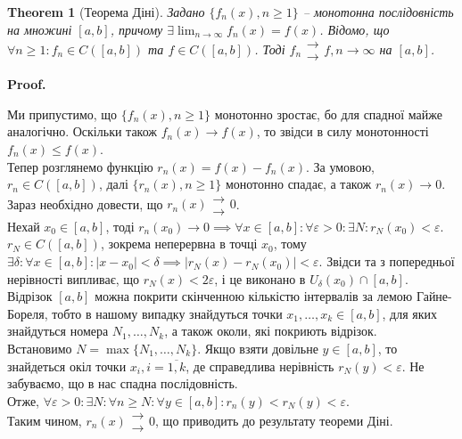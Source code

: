 \documentclass[a4paper, 10pt]{article}
\makeatletter
\def\huge{\displaystyle}
\def\qed{$\blacksquare$}
\theoremstyle{theoremdd}
\newtheorem{theorem}{Theorem}[subsection]
\theoremstyle{theoremdd}
\theoremstyle{theoremdd}
\theoremstyle{theoremdd}
\theoremstyle{theoremdd}
\newtheorem{example}[theorem]{Example}
\theoremstyle{theoremdd}
\theoremstyle{theoremdd}
\theoremstyle{theoremdd}
\theoremstyle{theoremdd}
\renewenvironment{proof}[1][Proof.\\]{\par
\pushQED{\hfill \qed}%
\normalfont \topsep6\p@\@plus6\p@\relax
\trivlist
\item\relax
{\bfseries
#1\@addpunct{.}}\hspace\labelsep\ignorespaces
}{%
\popQED\endtrivlist\@endpefalse
}
\makeatother
\begin{document}
\begin{theorem}[Теорема Діні]
Задано $\{ f_n(x), n \geq 1 \}$ -- монотонна послідовність на множині $[a,b]$, причому $\exists \huge\lim_{n \to \infty} f_n(x) = f(x)$. Відомо, що $\forall n \geq 1: f_n \in C([a,b])$ та $f \in C([a,b])$. Тоді $f_n \substack{\rightarrow \\ \rightarrow} f, n \to \infty$ на $[a,b]$.
\end{theorem}

\begin{proof}
Ми припустимо, що $\{ f_n(x), n \geq 1 \}$ монотонно зростає, бо для спадної майже аналогічно. Оскільки також $f_n(x) \to f(x)$, то звідси в силу монотонності $f_n(x) \leq f(x)$.\\
Тепер розглянемо функцію $r_n(x) = f(x) - f_n(x)$. За умовою, $r_n \in C([a,b])$, далі $\{r_n(x), n \geq 1\}$ монотонно спадає, а також $r_n(x) \to 0$. Зараз необхідно довести, що $r_n(x) \substack{\rightarrow \\ \rightarrow} 0$.\\
Нехай $x_0 \in [a,b]$, тоді $r_n(x_0) \to 0 \implies \forall x \in [a,b]: \forall \varepsilon > 0: \exists N: r_N(x_0) < \varepsilon$.
$r_N \in C([a,b])$, зокрема неперервна в точці $x_0$, тому $\exists \delta: \forall x \in [a,b]: |x-x_0| < \delta \implies |r_N(x) - r_N(x_0)| < \varepsilon$. Звідси та з попередньої нерівності випливає, що $r_N(x) < 2\varepsilon$, і це виконано в $U_{\delta} (x_0) \cap [a,b]$.\\
Відрізок $[a,b]$ можна покрити скінченною кількістю інтервалів за лемою Гайне-Бореля, тобто в нашому випадку знайдуться точки $x_1,\dots,x_k \in [a,b]$, для яких знайдуться номера $N_1,\dots,N_k$, а також околи, які покриють відрізок.\\
Встановимо $N = \max \{N_1,\dots,N_k\}$. Якщо взяти довільне $y \in [a,b]$, то знайдеться окіл точки $x_i, i = \overline{1,k}$, де справедлива нерівність $r_N(y) < \varepsilon$. Не забуваємо, що в нас спадна послідовність.\\
Отже, $\forall \varepsilon > 0: \exists N: \forall n \geq N: \forall y \in [a,b]: r_n(y) < r_N(y) < \varepsilon$.\\
Таким чином, $r_n(x) \substack{\rightarrow \\ \rightarrow} 0$, що приводить до результату теореми Діні.
\end{proof}

\iffalse
\begin{example}
Зокрема маємо послідовність $\left\{ f_n(x) = \left( 1 + \dfrac{x}{n} \right)^n, n \geq 1 \right\}$ на відрізку $[0,1]$. Маємо $f_n(x) \to e^x$ поточково при $n \to \infty$. Зрозуміло також, що $f_n \in C([0,1])$ та $e^{x} \in C([0,1])$.\\
\end{example}
\fi
\end{document}
